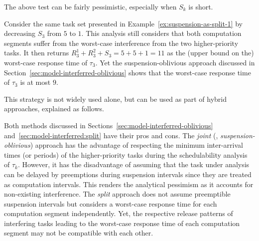 The above test can be fairly pessimistic, especially when $S_k$ is short. 
\begin{example}
\label{ex:suspension-as-split-2}   
Consider the same task set presented in Example~\ref{ex:suspension-as-split-1} by decreasing $S_3$ from $5$ to $1$. This analysis still considers that both computation segments suffer from the worst-case interference from the two higher-priority tasks. It then returns $R_3^1 + R_3^2 + S_3 = 5 + 5 + 1 =11$ as the (upper bound on the) worst-case response time of $\tau_3$. Yet the suspension-oblivious approach discussed in Section~\ref{sec:model-interferred-oblivious} shows that the worst-case response time of $\tau_3$ is at most $9$.
\hfill\myendproof  
\end{example} 

This strategy is not widely used alone, but can be used as part of hybrid approaches, explained as follows.

\label{sec:model-interferred-hybrid}

Both methods discussed in Sections~\ref{sec:model-interferred-oblivious} and~\ref{sec:model-interferred:split} have their pros and cons. The \emph{joint} (\ie, \emph{suspension-oblivious}) approach has the advantage of
respecting the minimum inter-arrival times (or periods) of the higher-priority tasks during the schedulability 
analysis of $\tau_k$. However, it has the disadvantage of assuming that the task under analysis can be delayed by preemptions during suspension intervals since they are treated as computation intervals. 
This renders the analytical pessimism as it accounts for non-existing interference. The \emph{split} approach does not assume  
preemptible suspension intervals but  considers a worst-case response time for each computation segment independently. Yet, the respective
release patterns of interfering tasks leading to the worst-case response time of each computation segment may not be compatible with each other.


